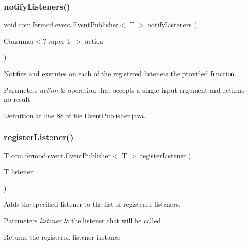 \subsubsection{\texorpdfstring{notifyListeners()}{notifyListeners()}}
{\footnotesize\ttfamily void \mbox{\hyperlink{classcom_1_1fermod_1_1event_1_1EventPublisher}{com.\+fermod.\+event.\+Event\+Publisher}}$<$ T $>$.notify\+Listeners (\begin{DoxyParamCaption}\item[{Consumer$<$? super T $>$}]{action }\end{DoxyParamCaption})}



Notifies and executes on each of the registered listeners the provided function. 


\begin{DoxyParams}{Parameters}
{\em action} & operation that accepts a single input argument and returns no result \\
\hline
\end{DoxyParams}


Definition at line 88 of file Event\+Publisher.\+java.

\mbox{\label{classcom_1_1fermod_1_1event_1_1EventPublisher_ad4ab74518bb83dede43fa2be3a38e8cd}} 
\subsubsection{\texorpdfstring{registerListener()}{registerListener()}}
{\footnotesize\ttfamily T \mbox{\hyperlink{classcom_1_1fermod_1_1event_1_1EventPublisher}{com.\+fermod.\+event.\+Event\+Publisher}}$<$ T $>$.register\+Listener (\begin{DoxyParamCaption}\item[{T}]{listener }\end{DoxyParamCaption})}



Adds the specified listener to the list of registered listeners. 


\begin{DoxyParams}{Parameters}
{\em listener} & the listener that will be called \\
\hline
\end{DoxyParams}
\begin{DoxyReturn}{Returns}
the registered listener instance 
\end{DoxyReturn}


